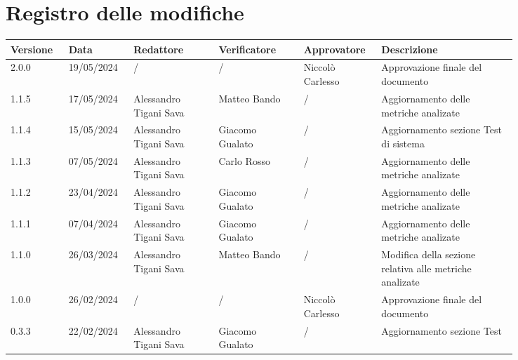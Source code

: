 \section*{Registro delle modifiche}
 {
  \renewcommand{\arraystretch}{1.5}
  \scriptsize
  \begin{longtable}{p{0.10\linewidth}p{0.10\linewidth}p{0.15\linewidth}p{0.15\linewidth}p{0.10\linewidth}p{0.24\linewidth}}
	  \textbf{Versione} & \textbf{Data} & \textbf{Redattore}     & \textbf{Verificatore} & \textbf{Approvatore} & \textbf{Descrizione}                                    \\
	  \toprule
	  2.0.0             & 19/05/2024    & /                      & /                     & Niccolò Carlesso     & Approvazione finale del documento                       \\
	  \hline
	  1.1.5             & 17/05/2024    & Alessandro Tigani Sava & Matteo Bando          & /                    & Aggiornamento delle metriche analizate                  \\
	  \hline
	  1.1.4             & 15/05/2024    & Alessandro Tigani Sava & Giacomo Gualato       & /                    & Aggiornamento sezione Test di sistema                   \\
	  \hline
	  1.1.3             & 07/05/2024    & Alessandro Tigani Sava & Carlo Rosso           & /                    & Aggiornamento delle metriche analizate                  \\
	  \hline
	  1.1.2             & 23/04/2024    & Alessandro Tigani Sava & Giacomo Gualato       & /                    & Aggiornamento delle metriche analizate                  \\
	  \hline
	  1.1.1             & 07/04/2024    & Alessandro Tigani Sava & Giacomo Gualato       & /                    & Aggiornamento delle metriche analizate                  \\
	  \hline
	  1.1.0             & 26/03/2024    & Alessandro Tigani Sava & Matteo Bando          & /                    & Modifica della sezione relativa alle metriche analizate \\
	  \hline
	  1.0.0             & 26/02/2024    & /                      & /                     & Niccolò Carlesso     & Approvazione finale del documento                       \\
	  \hline
	  0.3.3             & 22/02/2024    & Alessandro Tigani Sava & Giacomo Gualato       & /                    & Aggiornamento sezione Test                              \\

\end{longtable}}
